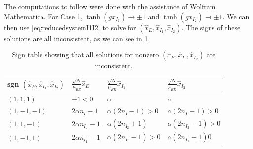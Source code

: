 \documentclass[reqno]{siamonline190516}
\begin{document}
The computations to follow were done with the assistance of Wolfram Mathematica. For Case 1, $\tanh(g x_{I_1}) \rightarrow \pm 1$ and $\tanh(g x_{I_2}) \rightarrow \pm 1$. We can then use \cref{eq:reducedsystemI1I2} to solve for $(\hat{x}_E, \hat{x}_{I_1}, \hat{x}_{I_2})$. The signs of these solutions are all inconsistent, as we can see in \cref{table:signtable}. 

\begin{table}
\centering
    \begin{tabular}{llll}
        \toprule
        sgn $(\hat{x}_E, \hat{x}_{I_1}, \hat{x}_{I_2})$ & $\frac{\sqrt{N}}{\mu_{EE}}\hat{x}_E$ & $\frac{\sqrt{N}}{\mu_{EE}}\hat{x}_{I_1}$ & $\frac{\sqrt{N}}{\mu_{EE}}\hat{x}_{I_2}$ \\
        \midrule
        $(1,1,1)$   & $-1 < 0$ & $\alpha$ & $\alpha$ \\
        $(1,-1,-1)$ & $2 \alpha n_I - 1$ & $\alpha(2 n_I - 1) > 0 $ & $\alpha(2 n_I - 1) > 0$ \\
        $(1,1,-1)$  & $2 \alpha n_{I_2} - 1$ & $\alpha(2 n_{I_2} + 1)$ & $\alpha(2 n_{I_2} - 1) > 0$  \\
        $(1,-1,1)$  & $2 \alpha n_{I_1} - 1$ & $\alpha(2 n_{I_1} - 1) > 0$ & $\alpha(2 n_{I_1} + 1)0$  \\
        \bottomrule
    \end{tabular}
    \label{table:signtable}
    \vspace{0.25cm}
    \caption{Sign table showing that all solutions for nonzero $(\hat{x}_E, \hat{x}_{I_1}, \hat{x}_{I_2})$ are inconsistent.}
\end{table}
\end{document}
